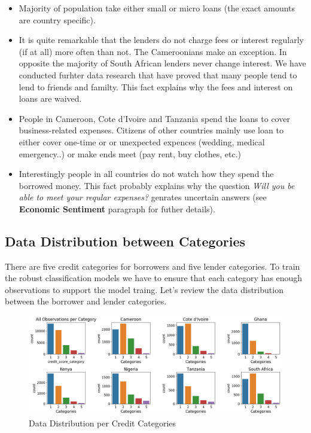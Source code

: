 \begin{itemize}
\tightlist
\item
  Majority of population take either small or micro loans (the exact
  amounts are country specific).
\item
  It is quite remarkable that the lenders do not charge fees or interest
  regularly (if at all) more often than not. The Cameroonians make an
  exception. In opposite the majority of South African lenders never
  change interest. We have conducted furhter data research that have
  proved that many people tend to lend to friends and familty. This fact
  explains why the fees and interest on loans are waived.
\item
  People in Cameroon, Cote d'Ivoire and Tanzania spend the loans to
  cover business-related expenses. Citizens of other countries mainly
  use loan to either cover one-time or or unexpected expences (wedding,
  medical emergency..) or make ends meet (pay rent, buy clothes, etc.)
\item
  Interestingly people in all countries do not watch how they spend the
  borrowed money. This fact probably explains why the question
  \emph{Will you be able to meet your reqular expenses?} genrates
  uncertain answers (see \textbf{Economic Sentiment} paragraph for
  futher details).
\end{itemize}

\hypertarget{data-distribution-between-categories}{%
\subsection{Data Distribution between
Categories}\label{data-distribution-between-categories}}

There are five credit categories for borrowers and five lender
categories. To train the robust classification models we have to ensure
that each category has enough observations to support the model traing.
Let's review the data distribution between the borrower and lender
categories.

\begin{Schunk}
\begin{figure}[H]

{\centering \includegraphics[width=1.15\linewidth]{../../artifacts/bcategories} 

}

\caption[Data Distribution per Credit Categories]{Data Distribution per Credit Categories}\label{fig:dc}
\end{figure}
\end{Schunk}

